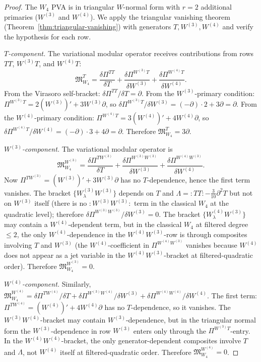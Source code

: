 \begin{proof}
The $W_4$ PVA is in triangular $W$-normal form with $r=2$ additional
primaries ($W^{(3)}$ and $W^{(4)}$). We apply the triangular vanishing
theorem (Theorem~\ref{thm:triangular-vanishing}) with generators
$T, W^{(3)}, W^{(4)}$ and verify the hypothesis for each row.

\smallskip
\noindent
\emph{$T$-component.}
The variational modular operator receives contributions from rows
$TT$, $W^{(3)}T$, and $W^{(4)}T$:
\[
\mathfrak{M}_{W_4}^T
=
\frac{\delta\Pi^{TT}}{\delta T}
+ \frac{\delta\Pi^{W^{(3)}T}}{\delta W^{(3)}}
+ \frac{\delta\Pi^{W^{(4)}T}}{\delta W^{(4)}}.
\]
From the Virasoro self-bracket: $\delta\Pi^{TT}/\delta T = \partial$.
From the $W^{(3)}$-primary condition:
$\Pi^{W^{(3)}T} = 2(W^{(3)})' + 3W^{(3)}\partial$, so
$\delta\Pi^{W^{(3)}T}/\delta W^{(3)} = (-\partial)\cdot 2 + 3\partial = \partial$.
From the $W^{(4)}$-primary condition:
$\Pi^{W^{(4)}T} = 3(W^{(4)})' + 4W^{(4)}\partial$, so
$\delta\Pi^{W^{(4)}T}/\delta W^{(4)} = (-\partial)\cdot 3 + 4\partial = \partial$.
Therefore $\mathfrak{M}_{W_4}^T = 3\partial$.

\smallskip
\noindent
\emph{$W^{(3)}$-component.}
The variational modular operator is
\[
\mathfrak{M}_{W_4}^{W^{(3)}}
=
\frac{\delta\Pi^{TW^{(3)}}}{\delta T}
+ \frac{\delta\Pi^{W^{(3)}W^{(3)}}}{\delta W^{(3)}}
+ \frac{\delta\Pi^{W^{(4)}W^{(3)}}}{\delta W^{(4)}}.
\]
Now $\Pi^{TW^{(3)}} = (W^{(3)})' + 3W^{(3)}\partial$ has no $T$-dependence,
hence the first term vanishes. The bracket $\{W^{(3)}_\lambda W^{(3)}\}$
depends on $T$ and $\Lambda = {:}TT{:} - \frac{3}{10}\partial^2 T$
but not on $W^{(3)}$ itself (there is no ${:}W^{(3)}W^{(3)}{:}$ term in the
classical $W_4$ at the quadratic level); therefore $\delta\Pi^{W^{(3)}W^{(3)}}/\delta W^{(3)} = 0$.
The bracket $\{W^{(4)}_\lambda W^{(3)}\}$ may contain a $W^{(4)}$-dependent
term, but in the classical $W_4$ at filtered degree $\le 2$, the only
$W^{(4)}$-dependence in the $W^{(4)}W^{(3)}$-row is through composites
involving $T$ and $W^{(3)}$ (the $W^{(4)}$-coefficient in $\Pi^{W^{(4)}W^{(3)}}$
vanishes because $W^{(4)}$ does not appear as a jet variable in the
$W^{(4)}W^{(3)}$-bracket at filtered-quadratic order).
Therefore $\mathfrak{M}_{W_4}^{W^{(3)}} = 0$.

\smallskip
\noindent
\emph{$W^{(4)}$-component.}
Similarly,
$\mathfrak{M}_{W_4}^{W^{(4)}}
=
\delta\Pi^{TW^{(4)}}/\delta T
+ \delta\Pi^{W^{(3)}W^{(4)}}/\delta W^{(3)}
+ \delta\Pi^{W^{(4)}W^{(4)}}/\delta W^{(4)}$.
The first term: $\Pi^{TW^{(4)}} = (W^{(4)})' + 4W^{(4)}\partial$
has no $T$-dependence, so it vanishes. The $W^{(3)}W^{(4)}$-bracket
may contain $W^{(3)}$-dependence, but in the triangular normal form
the $W^{(3)}$-dependence in row $W^{(3)}$ enters only through the
$\Pi^{W^{(3)}T}$-entry. In the $W^{(4)}W^{(4)}$-bracket, the only
generator-dependent composites involve $T$ and $\Lambda$, not $W^{(4)}$
itself at filtered-quadratic order. Therefore $\mathfrak{M}_{W_4}^{W^{(4)}} = 0$.


\end{proof}
